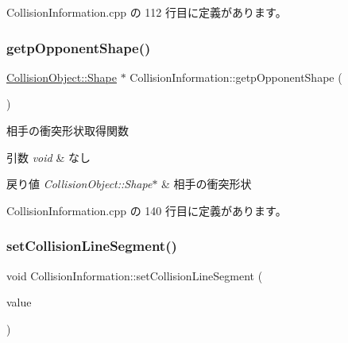  Collision\+Information.\+cpp の 112 行目に定義があります。

\mbox{\label{class_collision_information_afec0e3f4f686ac0fd1bea122495bdba9}} 
\subsubsection{\texorpdfstring{getp\+Opponent\+Shape()}{getpOpponentShape()}}
{\footnotesize\ttfamily \mbox{\hyperlink{class_collision_object_1_1_shape}{Collision\+Object\+::\+Shape}} $\ast$ Collision\+Information\+::getp\+Opponent\+Shape (\begin{DoxyParamCaption}{ }\end{DoxyParamCaption})}



相手の衝突形状取得関数 


\begin{DoxyParams}{引数}
{\em void} & なし \\
\hline
\end{DoxyParams}

\begin{DoxyRetVals}{戻り値}
{\em Collision\+Object\+::\+Shape$\ast$} & 相手の衝突形状 \\
\hline
\end{DoxyRetVals}


 Collision\+Information.\+cpp の 140 行目に定義があります。

\mbox{\label{class_collision_information_aa36f3b7ded9b176039b09ccc69acbf2a}} 
\subsubsection{\texorpdfstring{set\+Collision\+Line\+Segment()}{setCollisionLineSegment()}}
{\footnotesize\ttfamily void Collision\+Information\+::set\+Collision\+Line\+Segment (\begin{DoxyParamCaption}\item[{\mbox{\hyperlink{class_line_segment}{Line\+Segment}} $\ast$}]{value }\end{DoxyParamCaption})}



